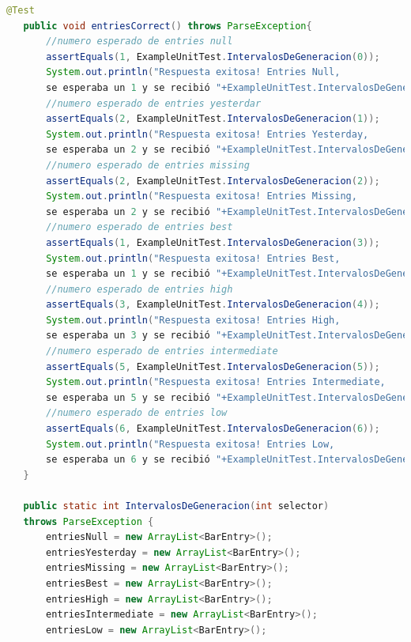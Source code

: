 \begin{lstlisting}[language= Java, frame=single]
   @Test
   public void entriesCorrect() throws ParseException{
       //numero esperado de entries null
       assertEquals(1, ExampleUnitTest.IntervalosDeGeneracion(0));
       System.out.println("Respuesta exitosa! Entries Null,
       se esperaba un 1 y se recibió "+ExampleUnitTest.IntervalosDeGeneracion(0));
       //numero esperado de entries yesterdar
       assertEquals(2, ExampleUnitTest.IntervalosDeGeneracion(1));
       System.out.println("Respuesta exitosa! Entries Yesterday,
       se esperaba un 2 y se recibió "+ExampleUnitTest.IntervalosDeGeneracion(1));
       //numero esperado de entries missing
       assertEquals(2, ExampleUnitTest.IntervalosDeGeneracion(2));
       System.out.println("Respuesta exitosa! Entries Missing,
       se esperaba un 2 y se recibió "+ExampleUnitTest.IntervalosDeGeneracion(2));
       //numero esperado de entries best
       assertEquals(1, ExampleUnitTest.IntervalosDeGeneracion(3));
       System.out.println("Respuesta exitosa! Entries Best,
       se esperaba un 1 y se recibió "+ExampleUnitTest.IntervalosDeGeneracion(3));
       //numero esperado de entries high
       assertEquals(3, ExampleUnitTest.IntervalosDeGeneracion(4));
       System.out.println("Respuesta exitosa! Entries High,
       se esperaba un 3 y se recibió "+ExampleUnitTest.IntervalosDeGeneracion(4));
       //numero esperado de entries intermediate
       assertEquals(5, ExampleUnitTest.IntervalosDeGeneracion(5));
       System.out.println("Respuesta exitosa! Entries Intermediate,
       se esperaba un 5 y se recibió "+ExampleUnitTest.IntervalosDeGeneracion(5));
       //numero esperado de entries low
       assertEquals(6, ExampleUnitTest.IntervalosDeGeneracion(6));
       System.out.println("Respuesta exitosa! Entries Low,
       se esperaba un 6 y se recibió "+ExampleUnitTest.IntervalosDeGeneracion(6));
   }

   public static int IntervalosDeGeneracion(int selector)
   throws ParseException {
       entriesNull = new ArrayList<BarEntry>();
       entriesYesterday = new ArrayList<BarEntry>();
       entriesMissing = new ArrayList<BarEntry>();
       entriesBest = new ArrayList<BarEntry>();
       entriesHigh = new ArrayList<BarEntry>();
       entriesIntermediate = new ArrayList<BarEntry>();
       entriesLow = new ArrayList<BarEntry>();


\end{lstlisting}
